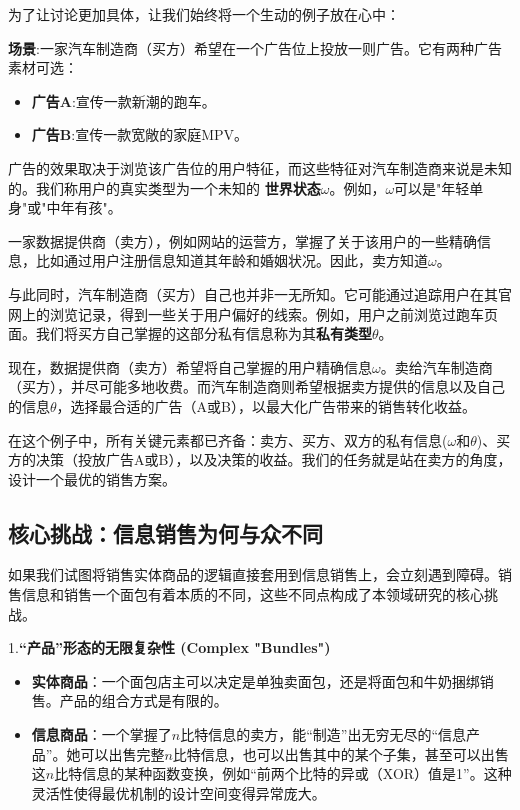 为了让讨论更加具体，让我们始终将一个生动的例子放在心中：

\textbf{场景}:一家汽车制造商（买方）希望在一个广告位上投放一则广告。它有两种广告素材可选：
\begin{itemize}
   \item \textbf{广告A}:宣传一款新潮的跑车。
   \item \textbf{广告B}:宣传一款宽敞的家庭MPV。
\end{itemize}

广告的效果取决于浏览该广告位的用户特征，而这些特征对汽车制造商来说是未知的。我们称用户的真实类型为一个未知的
\textbf{世界状态}$\omega$。例如，$\omega$可以是"年轻单身"或"中年有孩"。

一家数据提供商（卖方），例如网站的运营方，掌握了关于该用户的一些精确信息，比如通过用户注册信息知道其年龄和婚姻状况。因此，卖方知道$\omega$。

与此同时，汽车制造商（买方）自己也并非一无所知。它可能通过追踪用户在其官网上的浏览记录，得到一些关于用户偏好的线索。例如，用户之前浏览过跑车页面。我们将买方自己掌握的这部分私有信息称为其\textbf{私有类型}$\theta$。

现在，数据提供商（卖方）希望将自己掌握的用户精确信息$\omega$。卖给汽车制造商（买方），并尽可能多地收费。而汽车制造商则希望根据卖方提供的信息以及自己的信息$\theta$，选择最合适的广告（A或B），以最大化广告带来的销售转化收益。

在这个例子中，所有关键元素都已齐备：卖方、买方、双方的私有信息($\omega$和$\theta$)、买方的决策（投放广告A或B），以及决策的收益。我们的任务就是站在卖方的角度，设计一个最优的销售方案。

\subsection{核心挑战：信息销售为何与众不同}

如果我们试图将销售实体商品的逻辑直接套用到信息销售上，会立刻遇到障碍。销售信息和销售一个面包有着本质的不同，这些不同点构成了本领域研究的核心挑战。

1.\textbf{“产品”形态的无限复杂性 (Complex "Bundles")}
\begin{itemize}
   \item \textbf{实体商品}：一个面包店主可以决定是单独卖面包，还是将面包和牛奶捆绑销售。产品的组合方式是有限的。
   \item \textbf{信息商品}：一个掌握了$n$比特信息的卖方，能“制造”出无穷无尽的“信息产品”。她可以出售完整$n$比特信息，也可以出售其中的某个子集，甚至可以出售这$n$比特信息的某种函数变换，例如“前两个比特的异或（XOR）值是1”。这种灵活性使得最优机制的设计空间变得异常庞大。
\end{itemize}

